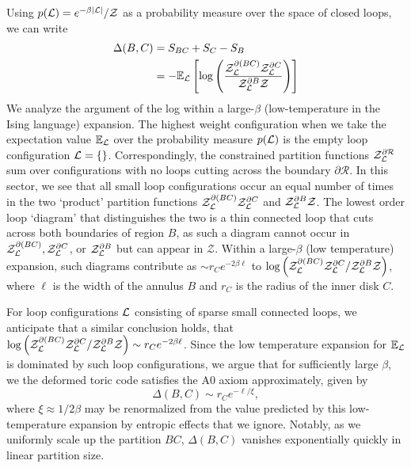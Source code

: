 Using $p(\mathcal{L}) = e^{-\beta \abs{\mathcal{L}}}/\mathcal{Z}$ as a probability measure over the space of closed loops, we can write
\begin{subequations}
\begin{align}
    \Delta(B,C) &= S_{BC} + S_C - S_B \\
    &= -\mathbb{E}_{\mathcal{L}}\left[ \log\left( \frac{\mathcal{Z}^{\partial(BC)}_{\mathcal{L}}\mathcal{Z}^{\partial C}_{\mathcal{L}}}{\mathcal{Z}^{\partial B}_{\mathcal{L}} \mathcal{Z}} \right)  \right]
\end{align}
\end{subequations}
We analyze the argument of the log within a large-$\beta$ (low-temperature in the Ising language) expansion. The highest weight configuration when we take the expectation value $\mathbb{E}_{\mathcal{L}}$ over the probability measure $p(\mathcal{L})$ is the empty loop configuration $\mathcal{L} = \{\}$. Correspondingly, the constrained partition functions $\mathcal{Z}^{\partial \mathcal{R}}_{\mathcal{L}}$ sum over configurations with no loops cutting across the boundary $\partial \mathcal{R}$. In this sector, we see that all small loop configurations occur an equal number of times in the two `product' partition functions ${\mathcal{Z}^{\partial(BC)}_{\mathcal{L}}\mathcal{Z}^{\partial C}_{\mathcal{L}}}$ and ${\mathcal{Z}^{\partial B}_{\mathcal{L}} \mathcal{Z}}$. The lowest order loop `diagram' that distinguishes the two is a thin connected loop that cuts across both boundaries of region $B$, as such a diagram cannot occur in ${\mathcal{Z}^{\partial(BC)}_{\mathcal{L}}, \mathcal{Z}^{\partial C}_{\mathcal{L}}}$, or ${\mathcal{Z}^{\partial B}_{\mathcal{L}}}$ but can appear in ${ \mathcal{Z}}$. Within a large-$\beta$ (low temperature) expansion, such diagrams contribute as $\sim r_C e^{-2\beta \ell}$ to $\log\left( {\mathcal{Z}^{\partial(BC)}_{\mathcal{L}}\mathcal{Z}^{\partial C}_{\mathcal{L}}}/{\mathcal{Z}^{\partial B}_{\mathcal{L}} \mathcal{Z}} \right)$, where $\ell$ is the width of the annulus $B$ and $r_C$ is the radius of the inner disk $C$.

For loop configurations $\mathcal{L}$ consisting of sparse small connected loops, we anticipate that a similar conclusion holds, that  $\log\left( {\mathcal{Z}^{\partial(BC)}_{\mathcal{L}}\mathcal{Z}^{\partial C}_{\mathcal{L}}}/{\mathcal{Z}^{\partial B}_{\mathcal{L}} \mathcal{Z}} \right) \sim r_C e^{-2\beta \ell}$. Since the low temperature expansion for $\mathbb{E}_{\mathcal{L}}$ is dominated by such loop configurations, we argue that for sufficiently large $\beta$, we the deformed toric code satisfies the A0 axiom approximately, given by 
\begin{equation}
    \Delta(B,C) \sim r_C e^{-\ell / \xi},
\end{equation}
where $\xi \approx 1/2\beta$ may be renormalized from the value predicted by this low-temperature expansion by entropic effects that we ignore. Notably, as we uniformly scale up the partition $BC$, $\Delta(B,C)$ vanishes exponentially quickly in linear partition size. 

